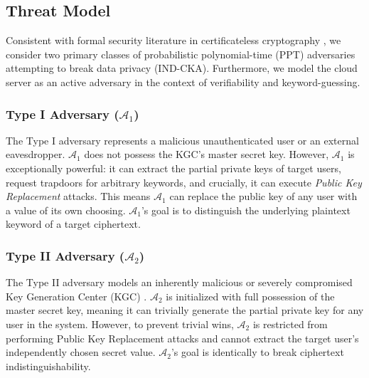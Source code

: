\documentclass[10pt,journal,compsoc]{IEEEtran}
\begin{document}
\subsection{Threat Model}
Consistent with formal security literature in certificateless cryptography \cite{lu2023certificateless, liu2023pairing}, we consider two primary classes of probabilistic polynomial-time (PPT) adversaries attempting to break data privacy (IND-CKA). Furthermore, we model the cloud server as an active adversary in the context of verifiability and keyword-guessing.

\subsubsection{Type I Adversary ($\mathcal{A}_1$)}
The Type I adversary represents a malicious unauthenticated user or an external eavesdropper. $\mathcal{A}_1$ does not possess the KGC's master secret key. However, $\mathcal{A}_1$ is exceptionally powerful: it can extract the partial private keys of target users, request trapdoors for arbitrary keywords, and crucially, it can execute \textit{Public Key Replacement} attacks. This means $\mathcal{A}_1$ can replace the public key of any user with a value of its own choosing. $\mathcal{A}_1$'s goal is to distinguish the underlying plaintext keyword of a target ciphertext.

\subsubsection{Type II Adversary ($\mathcal{A}_2$)}
The Type II adversary models an inherently malicious or severely compromised Key Generation Center (KGC) \cite{elhabob2020efficient}. $\mathcal{A}_2$ is initialized with full possession of the master secret key, meaning it can trivially generate the partial private key for any user in the system. However, to prevent trivial wins, $\mathcal{A}_2$ is restricted from performing Public Key Replacement attacks and cannot extract the target user's independently chosen secret value. $\mathcal{A}_2$'s goal is identically to break ciphertext indistinguishability.
\end{document}
